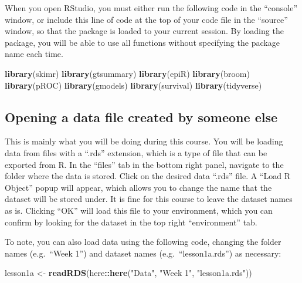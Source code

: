 \documentclass[]{book}
\newenvironment{Shaded}{\begin{snugshade}}{\end{snugshade}}
\newcommand{\KeywordTok}[1]{\textcolor[rgb]{0.13,0.29,0.53}{\textbf{#1}}}
\newcommand{\NormalTok}[1]{#1}
\newcommand{\OperatorTok}[1]{\textcolor[rgb]{0.81,0.36,0.00}{\textbf{#1}}}
\newcommand{\StringTok}[1]{\textcolor[rgb]{0.31,0.60,0.02}{#1}}
\begin{document}
When you open RStudio, you must either run the following code in the
``console'' window, or include this line of code at the top of your code
file in the ``source'' window, so that the package is loaded to your
current session. By loading the package, you will be able to use all
functions without specifying the package name each time.

\begin{Shaded}
\begin{Highlighting}[]
\KeywordTok{library}\NormalTok{(skimr)}
\KeywordTok{library}\NormalTok{(gtsummary)}
\KeywordTok{library}\NormalTok{(epiR)}
\KeywordTok{library}\NormalTok{(broom)}
\KeywordTok{library}\NormalTok{(pROC)}
\KeywordTok{library}\NormalTok{(gmodels)}
\KeywordTok{library}\NormalTok{(survival)}
\KeywordTok{library}\NormalTok{(tidyverse)}
\end{Highlighting}
\end{Shaded}

\hypertarget{opening-a-data-file-created-by-someone-else}{%
\subsection{Opening a data file created by someone
else}\label{opening-a-data-file-created-by-someone-else}}

This is mainly what you will be doing during this course. You will be
loading data from files with a ``.rds'' extension, which is a type of
file that can be exported from R. In the ``files'' tab in the bottom
right panel, navigate to the folder where the data is stored. Click on
the desired data ``.rds'' file. A ``Load R Object'' popup will appear,
which allows you to change the name that the dataset will be stored
under. It is fine for this course to leave the dataset names as is.
Clicking ``OK'' will load this file to your environment, which you can
confirm by looking for the dataset in the top right ``environment'' tab.

To note, you can also load data using the following code, changing the
folder names (e.g.~``Week 1'') and dataset names (e.g.~``lesson1a.rds'')
as necessary:

\begin{Shaded}
\begin{Highlighting}[]
\NormalTok{lesson1a <-}\StringTok{ }\KeywordTok{readRDS}\NormalTok{(here}\OperatorTok{::}\KeywordTok{here}\NormalTok{(}\StringTok{"Data"}\NormalTok{, }\StringTok{"Week 1"}\NormalTok{, }\StringTok{"lesson1a.rds"}\NormalTok{))}
\end{Highlighting}
\end{Shaded}
\end{document}
